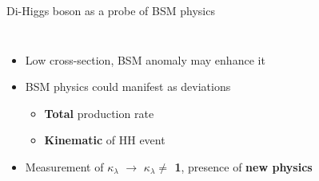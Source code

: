 \begin{frame}{Di-Higgs boson as a probe of BSM physics}

\begin{columns}
\begin{itemize}
    \item Low cross-section, BSM anomaly may enhance it
    \item BSM physics could manifest as deviations
    \begin{itemize}
        \item \textbf{\textcolor{HHred}{Total}} production rate
        \item \textbf{\textcolor{HHturquoise_m}{Kinematic}} of HH event
    \end{itemize}
    \item Measurement of $\kappa_{\lambda}$ $\to$ \textbf{$\kappa_{\lambda} \neq $ 1}, presence of \textbf{new physics} 
\end{itemize}


\end{columns}
\end{frame}
